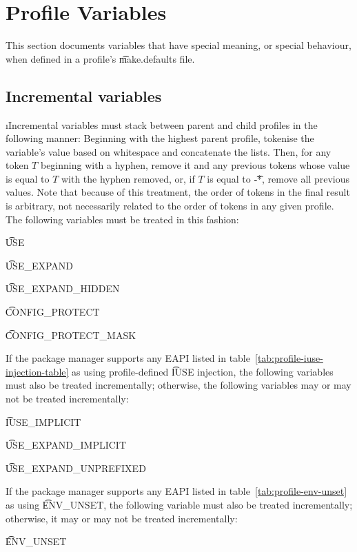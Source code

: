 \section{Profile Variables}
\label{sec:profile-variables}

This section documents variables that have special meaning, or special behaviour, when defined in a
profile's \t{make.defaults} file.

\subsection{Incremental variables}
\i{Incremental} variables must stack between parent and child profiles in the following manner:
Beginning with the highest parent profile, tokenise the variable's value based on whitespace and
concatenate the lists. Then, for any token $T$ beginning with a hyphen, remove it and any previous
tokens whose value is equal to $T$ with the hyphen removed, or, if $T$ is equal to \t{-*}, remove
all previous values. Note that because of this treatment, the order of tokens in the final result is
arbitrary, not necessarily related to the order of tokens in any given profile. The following
variables must be treated in this fashion:
\begin{compactitem}
\item \t{USE}
\item \t{USE_EXPAND}
\item \t{USE_EXPAND_HIDDEN}
\item \t{CONFIG_PROTECT}
\item \t{CONFIG_PROTECT_MASK}
\end{compactitem}

If the package manager supports any EAPI listed in table~\ref{tab:profile-iuse-injection-table} as
using profile-defined \t{IUSE} injection, the following variables must also be treated
incrementally; otherwise, the following variables may or may not be treated incrementally:
\begin{compactitem}
\item \t{IUSE_IMPLICIT}
\item \t{USE_EXPAND_IMPLICIT}
\item \t{USE_EXPAND_UNPREFIXED}
\end{compactitem}

If the package manager supports any EAPI listed in table~\ref{tab:profile-env-unset} as using
\t{ENV_UNSET}, the following variable must also be treated incrementally; otherwise, it may or
may not be treated incrementally:
\begin{compactitem}
\item \t{ENV_UNSET}
\end{compactitem}

